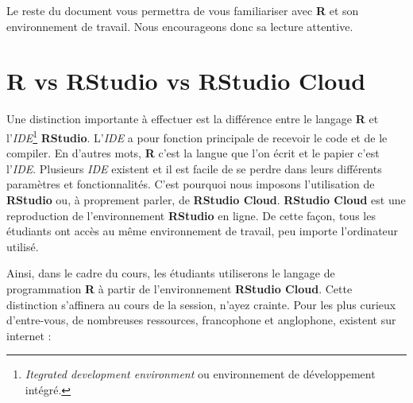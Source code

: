 \documentclass[10.5pt,a4paper]{article}
\begin{document}
Le reste du document vous permettra de vous familiariser avec \textbf{R} et son environnement de travail. Nous encourageons donc sa lecture attentive.

\section{R vs RStudio vs RStudio Cloud}

Une distinction importante à effectuer est la différence entre le langage \textbf{R} et l'\textit{IDE}\footnote{\emph{Itegrated development environment} ou environnement de développement intégré.} \textbf{RStudio}. L'\textit{IDE} a pour fonction principale de recevoir le code et de le compiler. En d'autres mots, \textbf{R} c'est la langue que l'on écrit et le papier c'est l'\textit{IDE}. Plusieurs \textit{IDE} existent et il est facile de se perdre dans leurs différents paramètres et fonctionnalités. C'est pourquoi nous imposons l'utilisation de \textbf{RStudio} ou, à proprement parler, de \textbf{RStudio Cloud}. \textbf{RStudio Cloud} est une reproduction de l'environnement \textbf{RStudio} en ligne. De cette façon, tous les étudiants ont accès au même environnement de travail, peu importe l'ordinateur utilisé.  

Ainsi, dans le cadre du cours, les étudiants utiliserons le langage de programmation \textbf{R} à partir de l'environnement \textbf{RStudio Cloud}. Cette distinction s'affinera au cours de la session, n'ayez crainte. Pour les plus curieux d'entre-vous, de nombreuses ressources, francophone et anglophone, existent sur internet :
\end{document}
